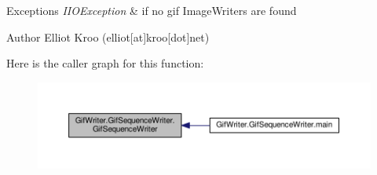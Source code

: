 \begin{DoxyExceptions}{Exceptions}
{\em I\-I\-O\-Exception} & if no gif Image\-Writers are found\\
\hline
\end{DoxyExceptions}
\begin{DoxyAuthor}{Author}
Elliot Kroo (elliot\mbox{[}at\mbox{]}kroo\mbox{[}dot\mbox{]}net) 
\end{DoxyAuthor}


Here is the caller graph for this function\-:\nopagebreak
\begin{figure}[H]
\begin{center}
\leavevmode
\includegraphics[width=350pt]{classGifWriter_1_1GifSequenceWriter_af253dbb98fab29cfc16fe44aab312ce9_icgraph}
\end{center}
\end{figure}




